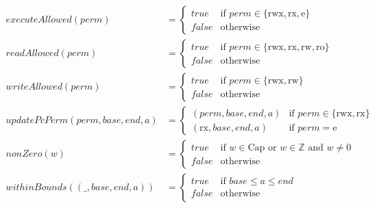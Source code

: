 \documentclass{article}
\newcommand{\false}{\mathit{false}}
\newcommand{\true}{\mathit{true}}
\newcommand{\var}[1]{\mathit{#1}}
\newcommand{\addr}{\var{a}}
\newcommand{\start}{\var{base}}
\newcommand{\addrend}{\var{end}}
\newcommand{\perm}{\var{perm}}
\newcommand{\plainfun}[1]{\mathit{#1}}
\newcommand{\updatePcPerm}[1]{\plainfun{updatePcPerm}(#1)}
\newcommand{\executeAllowed}[1]{\plainfun{executeAllowed}(#1)}
\newcommand{\nonZero}[1]{\plainfun{nonZero}(#1)}
\newcommand{\readAllowed}[1]{\plainfun{readAllowed}(#1)}
\newcommand{\writeAllowed}[1]{\plainfun{writeAllowed}(#1)}
\newcommand{\withinBounds}[1]{\plainfun{withinBounds}(#1)}
\newcommand{\plaindom}[1]{\mathrm{#1}}
\newcommand{\Caps}{\plaindom{Cap}}
\newcommand{\ints}{\mathbb{Z}}
\newcommand{\plainperm}[1]{\mathrm{#1}}
\newcommand{\readonly}{\plainperm{ro}}
\newcommand{\readwrite}{\plainperm{rw}}
\newcommand{\exec}{\plainperm{rx}}
\newcommand{\entry}{\plainperm{e}}
\newcommand{\rwx}{\plainperm{rwx}}
\begin{document}
\begin{align*}
  \executeAllowed{\perm} &=
                           \begin{cases}
                             \true & \text{if } \perm \in \{ \rwx, \exec, \entry \} \\
                             \false & \text{otherwise}
                           \end{cases} \\
  \readAllowed{\perm} &=
                           \begin{cases}
                             \true & \text{if } \perm \in \{ \rwx, \exec, \readwrite, \readonly \} \\
                             \false & \text{otherwise}
                           \end{cases} \\
  \writeAllowed{\perm} &=
                           \begin{cases}
                             \true & \text{if } \perm \in \{ \rwx, \readwrite\} \\
                             \false & \text{otherwise}
                           \end{cases} \\
  \updatePcPerm{\perm,\start,\addrend,\addr} &=
                                     \begin{cases}
                                       (\perm,\start,\addrend,\addr) & \text{if $\perm\in\{ \rwx, \exec \}$} \\
                                       (\exec,\start,\addrend,\addr) & \text{if $\perm = \entry$}
                                     \end{cases} \\
  \nonZero{w} &=
                \begin{cases}
                  \true & \text{if $w\in \Caps$ or $w\in \ints$ and $w \neq 0$}\\
                  \false & \text{otherwise}
                \end{cases} \\
  \withinBounds{(\_,\start,\addrend,\addr)} &=
                                              \begin{cases}
                                                \true  & \text{if $\start \leq \addr \leq \addrend$} \\
                                                \false & \text{otherwise}
                                              \end{cases} \\

\end{align*}
\end{document}
